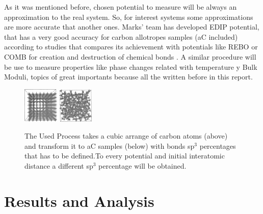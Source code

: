 \documentclass[a4paper,fleqn]{cas-dc}
\begin{document}
As it was mentioned before, chosen potential to measure will be always an approximation to the real system. So, for interest systems some approximations are more accurate that another ones. Marks' team has developed EDIP potential, that has a very good accuracy for carbon allotropes samples (aC included) according to studies that compares its achievement with potentials like REBO or COMB for creation and destruction of chemical bonds \cite{ACPot2}. A similar procedure will be use to measure properties like phase changes related with temperature y Bulk Moduli, topics of great importants because all the written before in this report.

    \begin{figure}
        \centering
        \includegraphics[width=0.15\textwidth]{carbon1.png}
        \includegraphics[width=0.15\textwidth]{carbon2.png}
    \caption{The Used Process takes a cubic arrange of carbon atoms (above) and transform it to aC samples (below) with bonds sp$^3$ percentages that has to be defined.To every potential and initial interatomic distance a different sp$^3$ percentage will be obtained. }
    \label{fig:carbon}
   \end{figure}

\section{Results and Analysis}
\end{document}
